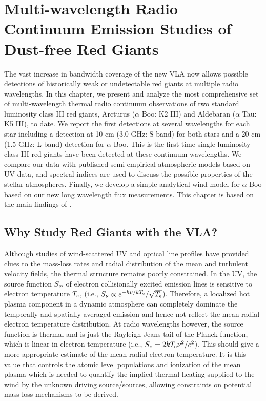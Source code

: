 
\chapter{Multi-wavelength Radio Continuum Emission Studies of \\ Dust-free Red Giants} \label{chap:6}

The vast increase in bandwidth coverage of the new VLA now allows possible detections of historically weak or undetectable red giants at multiple radio wavelengths. In this chapter, we present and analyze the most comprehensive set of multi-wavelength thermal radio continuum observations of two standard luminosity class III red giants, Arcturus ($\alpha$ Boo: K2 III) and Aldebaran ($\alpha$ Tau: K5 III), to date. We report the first detections at several wavelengths for each star including a detection at 10 cm (3.0 GHz: S-band) for both stars and a 20 cm (1.5 GHz: L-band) detection for $\alpha$ Boo. This is the first time single luminosity class III red giants have been detected at these continuum wavelengths. We compare our data with published semi-empirical atmospheric models based on UV data, and spectral indices are used to discuss the possible properties of the stellar atmospheres. Finally, we develop a simple analytical wind model for $\alpha$ Boo based on our new long wavelength flux measurements. This chapter is based on the main findings of \cite{ogorman_2013}.

\section{Why Study Red Giants with the VLA?}\label{sec:6.1}
Although studies of wind-scattered UV and optical line profiles have provided clues to the mass-loss rates and radial distribution of the mean and turbulent velocity fields, the thermal structure remains poorly constrained. In the UV, the source function $S_{\nu}$, of electron collisionally excited emission lines is sensitive to electron temperature $T_{\rm{e}}$, (i.e., $S_{\nu} \propto e^{-h\nu /kT_{\rm{e}}}/\sqrt{T_{\rm{e}}}$). Therefore, a localized hot plasma component in a dynamic atmosphere can completely dominate the temporally and spatially averaged emission and hence not reflect the mean radial electron temperature distribution. At radio wavelengths however, the source function is thermal and is just the Rayleigh-Jeans tail of the Planck function, which is linear in electron temperature (i.e., $S_{\nu} = {2kT_{\rm{e}}\nu ^2 /c^2}$). This should give a more appropriate estimate of the mean radial electron temperature. It is this value that controls the atomic level populations and ionization of the mean plasma which is needed to quantify the implied thermal heating supplied to the  wind by the unknown driving source/sources, allowing constraints on potential mass-loss mechanisms to be derived.

